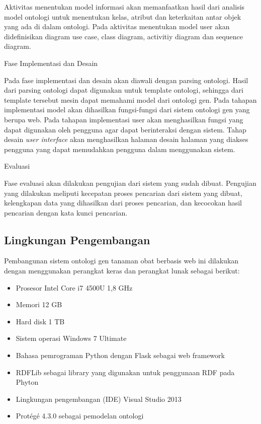 Aktivitas menentukan model informasi akan memanfaatkan hasil dari analisis model ontologi untuk menentukan kelas, atribut dan keterkaitan antar objek yang ada di dalam ontologi. Pada aktivitas menentukan model user akan didefinisikan diagram use case, class diagram, activitiy diagram dan sequence diagram.

Fase Implementasi dan Desain

Pada fase implementasi dan desain akan diawali dengan parsing ontologi. Hasil dari parsing ontologi dapat digunakan untuk template ontologi, sehingga dari template tersebut mesin dapat memahami model dari ontologi gen. Pada tahapan implementasi model akan dihasilkan fungsi-fungsi dari sistem ontologi gen yang berupa web. Pada tahapan implementasi user akan menghasilkan fungsi yang dapat digunakan oleh pengguna agar dapat berinteraksi dengan sistem. Tahap desain \textit{user interface} akan menghasilkan halaman desain halaman yang diakses pengguna yang dapat memudahkan pengguna dalam menggunakan sistem.

Evaluasi

Fase evaluasi akan dilakukan pengujian dari sistem yang sudah dibuat. Pengujian yang dilakukan meliputi kecepatan proses pencarian dari sistem yang dibuat, kelengkapan data yang dihasilkan dari proses pencarian, dan kecocokan hasil pencarian dengan kata kunci pencarian.


\subsection*{Lingkungan Pengembangan}

Pembangunan sistem ontologi gen tanaman obat berbasis web ini dilakukan dengan menggunakan perangkat keras dan perangkat lunak sebagai berikut:

\begin{itemize}
	\item Prosesor Intel Core i7 4500U 1,8 GHz
	\item Memori 12 GB
	\item Hard disk 1 TB
	\item Sistem operasi Windows 7 Ultimate
	\item Bahasa pemrograman Python dengan Flask sebagai web framework
	\item RDFLib sebagai library yang digunakan untuk penggunaan RDF pada Phyton
	\item Lingkungan pengembangan (IDE) Visual Studio 2013 
	\item Protégé 4.3.0 sebagai pemodelan ontologi
\end{itemize}

